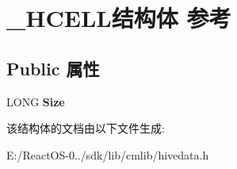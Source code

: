 \hypertarget{struct___h_c_e_l_l}{}\section{\+\_\+\+H\+C\+E\+L\+L结构体 参考}
\label{struct___h_c_e_l_l}
\subsection*{Public 属性}
\begin{DoxyCompactItemize}
\item 
\mbox{\label{struct___h_c_e_l_l_ac194869a607730cc54a9a74420dc3230}} 
L\+O\+NG {\bfseries Size}
\end{DoxyCompactItemize}


该结构体的文档由以下文件生成\+:\begin{DoxyCompactItemize}
\item 
E\+:/\+React\+O\+S-\/0../sdk/lib/cmlib/hivedata.\+h\end{DoxyCompactItemize}
